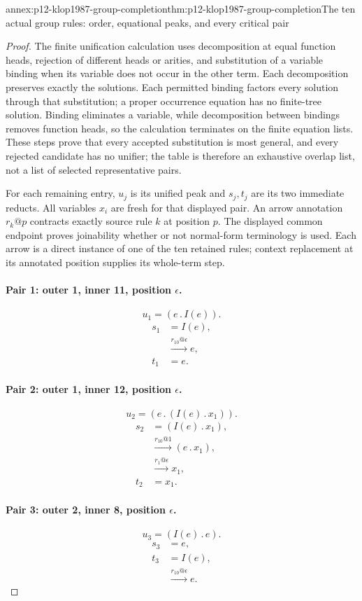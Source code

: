\begin{annexitem}{annex:p12-klop1987-group-completion}{thm:p12-klop1987-group-completion}{The ten actual group rules: order, equational peaks, and every critical pair}
\begin{proof}
The finite unification calculation uses decomposition at equal function
heads, rejection of different heads or arities, and substitution of a
variable binding when its variable does not occur in the other term.
Each decomposition preserves exactly the solutions. Each permitted
binding factors every solution through that substitution; a proper
occurrence equation has no finite-tree solution. Binding eliminates a
variable, while decomposition between bindings removes function heads,
so the calculation terminates on the finite equation lists.
These steps prove that every accepted substitution is most general,
and every rejected candidate has no unifier; the table is therefore
an exhaustive overlap list, not a list of selected representative pairs.

For each remaining entry, \(u_j\) is its unified peak and
\(s_j,t_j\) are its two immediate reducts. All variables \(x_i\) are
fresh for that displayed pair. An arrow annotation \(r_k@p\) contracts
exactly source rule \(k\) at position \(p\).
The displayed common endpoint proves joinability whether or not
normal-form terminology is used. Each arrow is a direct instance of
one of the ten retained rules; context replacement at its annotated
position supplies its whole-term step.

\paragraph{Pair 1: outer 1, inner 11, position \(\epsilon\).}
\[
 u_{1}=(e\mathbin{.}I(e)).
\]
\begin{align*}
 s_{1}&=I(e),\\
 &\xrightarrow{r_{10}@\epsilon}e,\\
 t_{1}&=e.
\end{align*}

\paragraph{Pair 2: outer 1, inner 12, position \(\epsilon\).}
\[
 u_{2}=(e\mathbin{.}(I(e)\mathbin{.}x_{1})).
\]
\begin{align*}
 s_{2}&=(I(e)\mathbin{.}x_{1}),\\
 &\xrightarrow{r_{10}@1}(e\mathbin{.}x_{1}),\\
 &\xrightarrow{r_{1}@\epsilon}x_{1},\\
 t_{2}&=x_{1}.
\end{align*}

\paragraph{Pair 3: outer 2, inner 8, position \(\epsilon\).}
\[
 u_{3}=(I(e)\mathbin{.}e).
\]
\begin{align*}
 s_{3}&=e,\\
 t_{3}&=I(e),\\
 &\xrightarrow{r_{10}@\epsilon}e.
\end{align*}


\end{proof}
\end{annexitem}
